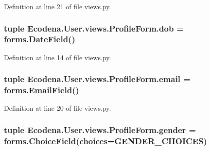 Definition at line 21 of file views.py.

\hypertarget{class_ecodena_1_1_user_1_1views_1_1_profile_form_a697b83b7d7dc1b7899bc1d9ee1b9344d}{
\subsubsection[{dob}]{\setlength{\rightskip}{0pt plus 5cm}tuple {\bf Ecodena.User.views.ProfileForm.dob} = forms.DateField()}}
\label{db/d79/class_ecodena_1_1_user_1_1views_1_1_profile_form_a697b83b7d7dc1b7899bc1d9ee1b9344d}


Definition at line 14 of file views.py.

\hypertarget{class_ecodena_1_1_user_1_1views_1_1_profile_form_add6304c2997c575733a2e1a47113752c}{
\subsubsection[{email}]{\setlength{\rightskip}{0pt plus 5cm}tuple {\bf Ecodena.User.views.ProfileForm.email} = forms.EmailField()}}
\label{db/d79/class_ecodena_1_1_user_1_1views_1_1_profile_form_add6304c2997c575733a2e1a47113752c}


Definition at line 20 of file views.py.

\hypertarget{class_ecodena_1_1_user_1_1views_1_1_profile_form_a943ea113aeb5c4ce8109a079119bb84e}{
\subsubsection[{gender}]{\setlength{\rightskip}{0pt plus 5cm}tuple {\bf Ecodena.User.views.ProfileForm.gender} = forms.ChoiceField(choices={\bf GENDER\_\-CHOICES})}}
\label{db/d79/class_ecodena_1_1_user_1_1views_1_1_profile_form_a943ea113aeb5c4ce8109a079119bb84e}


